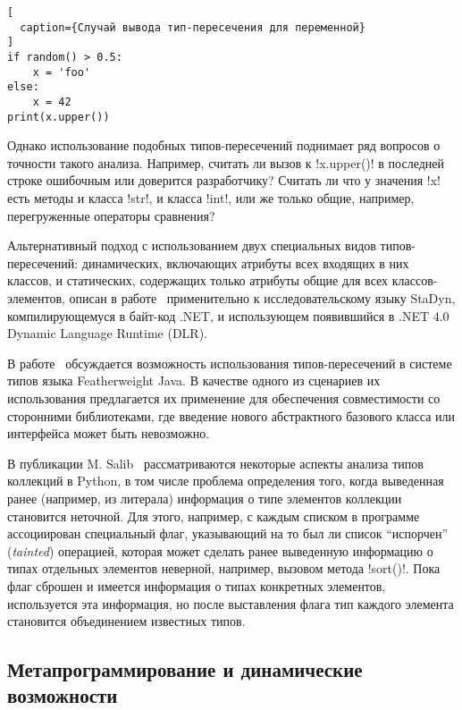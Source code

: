 \begin{lstlisting}[
  caption={Случай вывода тип-пересечения для переменной}
]
if random() > 0.5:
    x = 'foo'
else:
    x = 42
print(x.upper())
\end{lstlisting}

Однако использование подобных типов-пересечений поднимает ряд вопросов о
точности такого анализа. Например, считать ли вызов к !x.upper()! в последней
строке ошибочным или доверится разработчику? Считать ли что у значения !x! есть
методы и класса !str!, и класса !int!, или же только общие, например,
перегруженные операторы сравнения?

Альтернативный подход с использованием двух специальных видов типов-пересечений:
динамических, включающих атрибуты всех входящих в них классов, и статических,
содержащих только атрибуты общие для всех классов-элементов, описан в
работе~\cite{Ortin2011:union} применительно к исследовательскому языку StaDyn,
компилирующемуся в байт-код .NET, и использующем появившийся в .NET 4.0 Dynamic
Language Runtime (DLR).


В работе~\cite{Igarashi2006} обсуждается возможность использования
типов-пересечений в системе типов языка Featherweight Java. В качестве одного из
сценариев их использования предлагается их применение для обеспечения
совместимости со сторонними библиотеками, где введение нового абстрактного
базового класса или интерфейса может быть невозможно.  

В публикации M. Salib~\cite{Salib2004} рассматриваются некоторые аспекты анализа
типов коллекций в Python, в том числе проблема определения того, когда
выведенная ранее (например, из литерала) информация о типе элементов коллекции
становится неточной. Для этого, например, с каждым списком в программе ассоциирован
специальный флаг, указывающий на то был ли список ``испорчен'' (\emph{tainted})
операцией, которая может сделать ранее выведенную информацию о типах отдельных
элементов неверной, например, вызовом метода !sort()!. Пока флаг сброшен и имеется
информация о типах конкретных элементов, используется эта информация, но после
выставления флага тип каждого элемента становится объединением известных типов.

\subsection{Метапрограммирование и динамические возможности}

